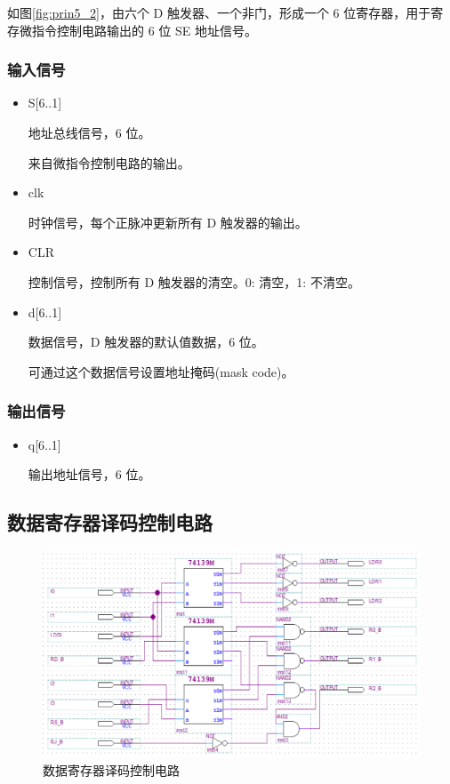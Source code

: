 如图\ref{fig:prin5_2}，由六个 D 触发器、一个非门，形成一个 6 位寄存器，用于寄存微指令控制电路输出的 6 位 SE 地址信号。

\subsubsection{输入信号}

\begin{itemize}
    \item S[6..1]
    
    地址总线信号，6 位。
    
    来自微指令控制电路的输出。
    
    \item clk
    
    时钟信号，每个正脉冲更新所有 D 触发器的输出。
    
    \item CLR
    
    控制信号，控制所有 D 触发器的清空。0: 清空，1: 不清空。
    
    \item d[6..1]
    
    数据信号，D 触发器的默认值数据，6 位。
    
    可通过这个数据信号设置地址掩码(mask code)。
    
\end{itemize} 

\subsubsection{输出信号}

\begin{itemize}
    \item q[6..1]
    
    输出地址信号，6 位。
    
\end{itemize}

\subsection{数据寄存器译码控制电路}


\begin{figure}[H]
\centering
\includegraphics[width=\textwidth]{images/prin5_3.png}
\caption{数据寄存器译码控制电路}
\label{fig:prin5_3}
\end{figure}

